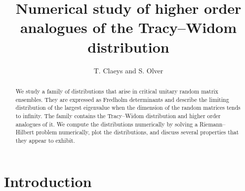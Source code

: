 \documentclass[11pt,fleqn]{article}
\numberwithin{equation}{section}
\begin{document}
\title{Numerical study of higher order analogues of the Tracy--Widom distribution}
\author{T. Claeys and S. Olver}
\maketitle

\begin{abstract}
We study a family of distributions that arise in critical unitary random matrix
ensembles. They are expressed as Fredholm determinants and describe the limiting
distribution of the largest eigenvalue when the dimension
of the random matrices tends to infinity. The family contains the Tracy--Widom distribution and higher order analogues of
it. We compute the distributions numerically by solving a Riemann--Hilbert problem numerically, plot the distributions, and discuss several properties that they appear to exhibit.
\end{abstract}

\section{Introduction}
\end{document}
